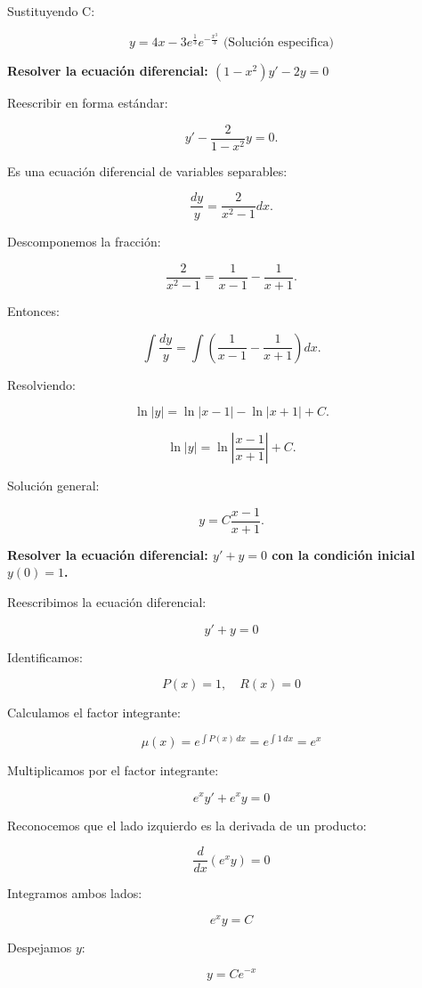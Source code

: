 \documentclass[answers]{exam}
\begin{document}
\begin{questions}
	Sustituyendo C:

	\[
		y = 4x - 3 e^{\frac{1}{3}} e^{-\frac{x^3}{3}} \text{ (Solución especifica)}
	\]
	\newpage

	\question \textbf{Resolver la ecuación diferencial:
		$
			(1 - x^2)y' - 2y = 0
		$}


	Reescribir en forma estándar:

	\[
		y' - \frac{2}{1 - x^2} y = 0.
	\]

	Es una ecuación diferencial de variables separables:

	\[
		\frac{dy}{y} = \frac{2}{x^2 - 1} dx.
	\]

	Descomponemos la fracción:

	\[
		\frac{2}{x^2 - 1} = \frac{1}{x - 1} - \frac{1}{x + 1}.
	\]

	Entonces:

	\[
		\int \frac{dy}{y} = \int \left( \frac{1}{x - 1} - \frac{1}{x + 1} \right) dx.
	\]

	Resolviendo:

	\[
		\ln |y| = \ln |x - 1| - \ln |x + 1| + C.
	\]

	\[
		\ln |y| = \ln \left| \frac{x - 1}{x + 1} \right| + C.
	\]

	Solución general:

	\[
		y = C \frac{x - 1}{x + 1}.
	\]


	\question \textbf{Resolver la ecuación diferencial:
		$
			y' + y = 0
		$
		con la condición inicial \( y(0) = 1 \).}


	Reescribimos la ecuación diferencial:

	\[
		y' + y = 0
	\]

	Identificamos:

	\[
		P(x) = 1, \quad R(x) = 0
	\]

	Calculamos el factor integrante:

	\[
		\mu(x) = e^{\int P(x) \, dx} = e^{\int 1 \, dx} = e^x
	\]

	Multiplicamos por el factor integrante:

	\[
		e^x y' + e^x y = 0
	\]

	Reconocemos que el lado izquierdo es la derivada de un producto:

	\[
		\frac{d}{dx} \left(e^x y\right) = 0
	\]

	Integramos ambos lados:

	\[
		e^x y = C
	\]

	Despejamos \( y \):

	\[
		y = C e^{-x}
	\]


\end{questions}
\end{document}

